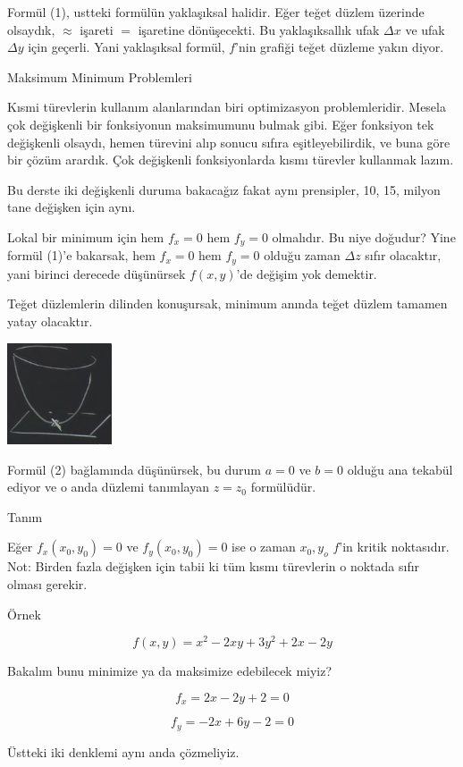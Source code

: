 \documentclass[12pt,fleqn]{article}\usepackage{../../common}
\begin{document}
Formül (1), ustteki formülün yaklaşıksal halidir. Eğer teğet düzlem üzerinde
olsaydık, $\approx$ işareti $=$ işaretine dönüşecekti. Bu yaklaşıksallık ufak
$\Delta x$ ve ufak $\Delta y$ için geçerli. Yani yaklaşıksal formül, $f$'nin
grafiği teğet düzleme yakın diyor.

Maksimum Minimum Problemleri 

Kısmi türevlerin kullanım alanlarından biri optimizasyon problemleridir. Mesela
çok değişkenli bir fonksiyonun maksimumunu bulmak gibi. Eğer fonksiyon tek
değişkenli olsaydı, hemen türevini alıp sonucu sıfıra eşitleyebilirdik, ve buna
göre bir çözüm arardık. Çok değişkenli fonksiyonlarda kısmı türevler kullanmak
lazım.

Bu derste iki değişkenli duruma bakacağız fakat aynı prensipler, 10, 15,
milyon tane değişken için aynı. 

Lokal bir minimum için hem $f_x=0$ hem $f_y=0$ olmalıdır. Bu niye doğudur? Yine
formül (1)'e bakarsak, hem $f_x=0$ hem $f_y=0$ olduğu zaman $\Delta z$ sıfır
olacaktır, yani birinci derecede düşünürsek $f(x,y)$'de değişim yok demektir.

Teğet düzlemlerin dilinden konuşursak, minimum anında teğet düzlem tamamen
yatay olacaktır. 

\includegraphics[height=3cm]{9_3.png}

Formül (2) bağlamında düşünürsek, bu durum $a=0$ ve $b=0$ olduğu ana tekabül
ediyor ve o anda düzlemi tanımlayan $z = z_0$ formülüdür.

Tanım

Eğer $f_x(x_0,y_0)= 0$ ve $f_y(x_0,y_0)= 0$ ise o zaman $x_0,y_o$ $f$'in kritik
noktasıdır. Not: Birden fazla değişken için tabii ki tüm kısmı türevlerin o
noktada sıfır olması gerekir.

Örnek

$$ f(x,y) = x^2 - 2xy + 3y^2 + 2x - 2y $$

Bakalım bunu minimize ya da maksimize edebilecek miyiz? 

$$ f_x = 2x - 2y + 2 = 0$$

$$ f_y = -2x + 6y - 2 = 0 $$

Üstteki iki denklemi aynı anda çözmeliyiz. 
\end{document}
